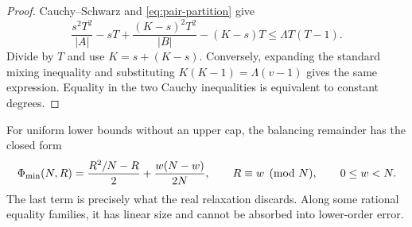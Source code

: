 \begin{proof}
Cauchy--Schwarz and \eqref{eq:pair-partition} give
\[
 \frac{s^2T^2}{|A|}-sT
 +\frac{(K-s)^2T^2}{|B|}-(K-s)T
 \le \Lambda T(T-1).
\]
Divide by \(T\) and use \(K=s+(K-s)\).  Conversely, expanding the standard
mixing inequality and substituting
\(K(K-1)=\Lambda(v-1)\) gives the same expression.  Equality in the two
Cauchy inequalities is equivalent to constant degrees.
\end{proof}

For uniform lower bounds without an upper cap, the balancing remainder has the
closed form
\begin{equation}\label{eq:rounding-remainder}
 \Phi_{\min}(N,R)=\frac{R^2/N-R}{2}+\frac{w(N-w)}{2N},
 \qquad R\equiv w\pmod N,\qquad 0\le w<N.
\end{equation}
The last term is precisely what the real relaxation discards.  Along some
rational equality families, it has linear size and cannot be absorbed into
lower-order error.
